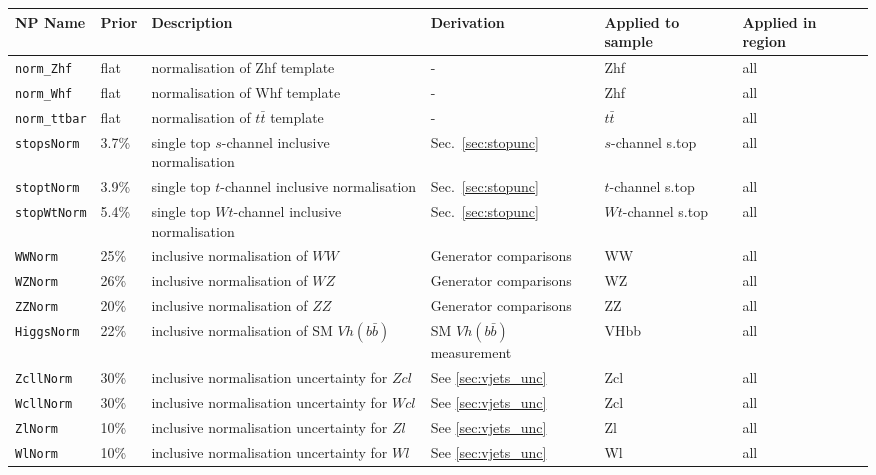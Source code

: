 \begin{table}[ht]
    \centering
    \scriptsize
    \begin{tabular}{|p{2.5cm}|p{1.5cm}|p{3cm}|p{2cm}|p{1.5cm}|p{1.5cm}|}
        \hline
        NP Name & Prior & Description & Derivation & Applied to sample & Applied in region \\
        \hline
        \texttt{norm\_Zhf} & flat & normalisation of Zhf template & - & Zhf & all \\
        \texttt{norm\_Whf} & flat & normalisation of Whf template & - & Zhf & all \\
        \texttt{norm\_ttbar} & flat & normalisation of $t\bar{t}$ template & - & $t\bar{t}$ & all \\
        \hline
        \hline
        \texttt{stopsNorm} & 3.7\% & single top $s$-channel inclusive normalisation & Sec.~\ref{sec:stopunc} & $s$-channel s.top & all \\
        \texttt{stoptNorm} & 3.9\% & single top $t$-channel inclusive normalisation & Sec.~\ref{sec:stopunc}& $t$-channel s.top & all \\
        \texttt{stopWtNorm} & 5.4\% & single top $Wt$-channel inclusive normalisation & Sec.~\ref{sec:stopunc} & $Wt$-channel s.top & all \\
        \texttt{WWNorm} & 25\% & inclusive normalisation of $WW$ & Generator comparisons & WW & all \\
        \texttt{WZNorm} & 26\% & inclusive normalisation of $WZ$ & Generator comparisons & WZ & all \\
        \texttt{ZZNorm} & 20\% & inclusive normalisation of $ZZ$ & Generator comparisons &ZZ & all \\
        \texttt{HiggsNorm} & 22\% & inclusive normalisation of SM $Vh(b\bar{b})$ & SM $Vh(b\bar{b})$ measurement \cite{Aaboud:2018zhk} & VHbb & all \\
        \hline
        \hline
        \texttt{ZcllNorm} & 30\% & inclusive normalisation uncertainty for $Zcl$ & See \ref{sec:vjets_unc} & Zcl & all \\
        \texttt{WcllNorm} & 30\% & inclusive normalisation uncertainty for $Wcl$ & See \ref{sec:vjets_unc} & Zcl & all \\
        \texttt{ZlNorm} & 10\% & inclusive normalisation uncertainty for $Zl$ & See \ref{sec:vjets_unc} & Zl & all \\
        \texttt{WlNorm} & 10\% & inclusive normalisation uncertainty for $Wl$ & See \ref{sec:vjets_unc} & Wl & all \\

\end{tabular}
\end{table}
